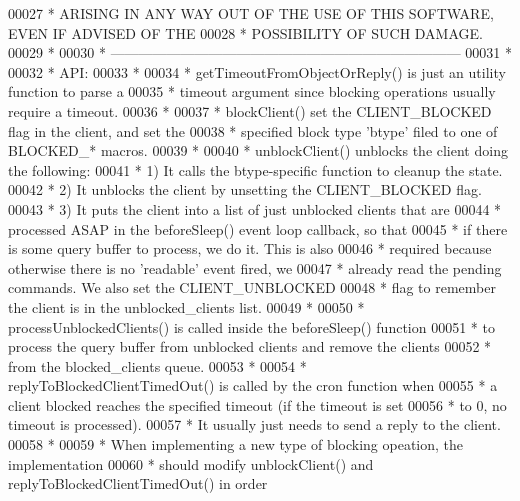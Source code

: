 \begin{DoxyCode}
00027 \textcolor{comment}{ * ARISING IN ANY WAY OUT OF THE USE OF THIS SOFTWARE, EVEN IF ADVISED OF THE}
00028 \textcolor{comment}{ * POSSIBILITY OF SUCH DAMAGE.}
00029 \textcolor{comment}{ *}
00030 \textcolor{comment}{ * ---------------------------------------------------------------------------}
00031 \textcolor{comment}{ *}
00032 \textcolor{comment}{ * API:}
00033 \textcolor{comment}{ *}
00034 \textcolor{comment}{ * getTimeoutFromObjectOrReply() is just an utility function to parse a}
00035 \textcolor{comment}{ * timeout argument since blocking operations usually require a timeout.}
00036 \textcolor{comment}{ *}
00037 \textcolor{comment}{ * blockClient() set the CLIENT\_BLOCKED flag in the client, and set the}
00038 \textcolor{comment}{ * specified block type 'btype' filed to one of BLOCKED\_* macros.}
00039 \textcolor{comment}{ *}
00040 \textcolor{comment}{ * unblockClient() unblocks the client doing the following:}
00041 \textcolor{comment}{ * 1) It calls the btype-specific function to cleanup the state.}
00042 \textcolor{comment}{ * 2) It unblocks the client by unsetting the CLIENT\_BLOCKED flag.}
00043 \textcolor{comment}{ * 3) It puts the client into a list of just unblocked clients that are}
00044 \textcolor{comment}{ *    processed ASAP in the beforeSleep() event loop callback, so that}
00045 \textcolor{comment}{ *    if there is some query buffer to process, we do it. This is also}
00046 \textcolor{comment}{ *    required because otherwise there is no 'readable' event fired, we}
00047 \textcolor{comment}{ *    already read the pending commands. We also set the CLIENT\_UNBLOCKED}
00048 \textcolor{comment}{ *    flag to remember the client is in the unblocked\_clients list.}
00049 \textcolor{comment}{ *}
00050 \textcolor{comment}{ * processUnblockedClients() is called inside the beforeSleep() function}
00051 \textcolor{comment}{ * to process the query buffer from unblocked clients and remove the clients}
00052 \textcolor{comment}{ * from the blocked\_clients queue.}
00053 \textcolor{comment}{ *}
00054 \textcolor{comment}{ * replyToBlockedClientTimedOut() is called by the cron function when}
00055 \textcolor{comment}{ * a client blocked reaches the specified timeout (if the timeout is set}
00056 \textcolor{comment}{ * to 0, no timeout is processed).}
00057 \textcolor{comment}{ * It usually just needs to send a reply to the client.}
00058 \textcolor{comment}{ *}
00059 \textcolor{comment}{ * When implementing a new type of blocking opeation, the implementation}
00060 \textcolor{comment}{ * should modify unblockClient() and replyToBlockedClientTimedOut() in order}

\end{DoxyCode}
